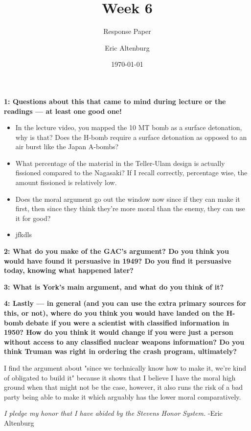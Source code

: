 \documentclass[12pt]{turabian-researchpaper}
\title{Week 6}
\subtitle{Response Paper}
\author{Eric Altenburg}
\date{\today}
\newcommand\question[2]{\noindent\textbf{#1: #2}}
\begin{document}
	\maketitle

	\question{1}{Questions about this that came to mind during lecture or the readings — at least one good one!}

		\begin{itemize}
			\item In the lecture video, you mapped the 10 MT bomb as a surface detonation, why is that? Does the H-bomb require a surface detonation as opposed to an air burst like the Japan A-bombs?
			\item What percentage of the material in the Teller-Ulam design is actually fissioned compared to the Nagasaki? If I recall correctly, percentage wise, the amount fissioned is relatively low.
			\item Does the moral argument go out the window now since if they can make it first, then since they think they're more moral than the enemy, they can use it for good?
			\item jfkdls
		\end{itemize}

	\newpage
	\question{2}{What do you make of the GAC's argument? Do you think you would have found it persuasive in 1949? Do you find it persuasive today, knowing what happened later?}

	\newpage
	\question{3}{What is York's main argument, and what do you think of it?}

	\newpage
	\question{4}{Lastly — in general (and you can use the extra primary sources for this, or not), where do you think you would have landed on the H-bomb debate if you were a scientist with classified information in 1950? How do you think it would change if you were just a person without access to any classified nuclear weapons information? Do you think Truman was right in ordering the crash program, ultimately?}

		I find the argument about "since we technically know how to make it, we're kind of obligated to build it" because it shows that I believe I have the moral high ground when that might not be the case, however, it also runs the risk of a bad party being able to make it which arguably has the lower moral comparatively.
		

\vspace*{\fill}
\noindent\textit{I pledge my honor that I have abided by the Stevens Honor System.} -Eric Altenburg
\end{document}
